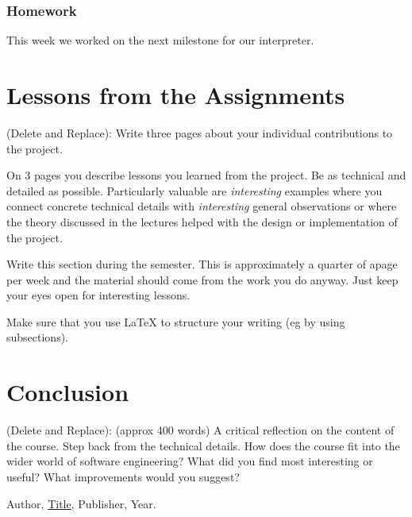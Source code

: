 \documentclass{article}
\theoremstyle{theorem}
\theoremstyle{definition}
\theoremstyle{remark}
\begin{document}
\subsubsection*{Homework} This week we worked on the next milestone for our interpreter.

\section{Lessons from the Assignments}

(Delete and Replace): Write three pages about your individual contributions to the project.

On 3 pages you describe lessons you learned from the project. Be as technical and detailed as possible. Particularly valuable are \emph{interesting} examples where you connect concrete technical details with \emph{interesting} general observations or where the theory discussed in the lectures helped with the design or implementation of the project.

Write this section during the semester. This is approximately a quarter of apage per week and the material should come from the work you do anyway. Just keep your eyes open for interesting lessons.

Make sure that you use \LaTeX{} to structure your writing (eg by using subsections).

\section{Conclusion}\label{conclusion}

(Delete and Replace): (approx 400 words) A critical reflection on the content of the course. Step back from the technical details. How does the course fit into the wider world of software engineering? What did you find most interesting or useful? What improvements would you suggest?

\begin{thebibliography}{99}
 Author, \href{https://en.wikipedia.org/wiki/LaTeX}{Title}, Publisher, Year.
\end{thebibliography}
\end{document}

